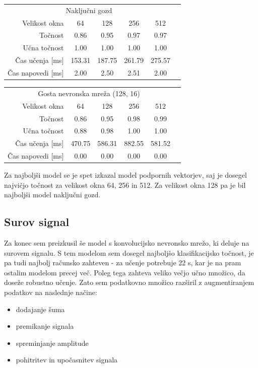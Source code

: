 \documentclass[11pt,a4paper]{article}
\begin{document}
\begin{center}
    \begin{tabular}{r | c c c c c}
        \multicolumn{5}{c}{Naključni gozd}\\
        \tiny{Velikost okna} & \small{64} & \small{128} & \small{256} & \small{512}\\ \hline
        \tiny{Točnost} & \small{0.86} & \small{0.95} & \small{0.97} & \small{0.97}\\
        \tiny{Učna točnost} & \small{1.00} & \small{1.00} & \small{1.00} & \small{1.00}\\
        \tiny{Čas učenja [ms]} & \small{153.31} & \small{187.75} & \small{261.79} & \small{275.57}\\
        \tiny{Čas napovedi [ms]} & \small{2.00} & \small{2.50} & \small{2.51} & \small{2.00}\\
        \end{tabular}

    \begin{tabular}{r | c c c c c}
        \multicolumn{5}{c}{Gosta nevronska mreža (128, 16)}\\
        \tiny{Velikost okna} & \small{64} & \small{128} & \small{256} & \small{512}\\ \hline
        \tiny{Točnost} & \small{0.86} & \small{0.95} & \small{0.98} & \small{0.99}\\
        \tiny{Učna točnost} & \small{0.88} & \small{0.98} & \small{1.00} & \small{1.00}\\
        \tiny{Čas učenja [ms]} & \small{470.75} & \small{586.31} & \small{882.55} & \small{581.52}\\
        \tiny{Čas napovedi [ms]} & \small{0.00} & \small{0.00} & \small{0.00} & \small{0.00}\\
        \end{tabular}
\end{center}


Za najboljši model se je spet izkazal model podpornih vektorjev, saj je dosegel najvičjo točnost za velikost okna 64, 256 in 512. Za velikost okna 128 pa je bil najboljši model naključni gozd. 


\subsection{Surov signal}

Za konec sem preizkusil še model s konvolucijsko nevronsko mrežo, ki deluje na surovem signalu. S tem modelom sem dosegel najboljšo klasifikacijsko točnost, je pa tudi najbolj računsko zahteven - za učenje potrebuje 22 s, kar je na pram ostalim modelom precej več. Poleg tega zahteva veliko večjo učno množico, da doseže robustno učenje. Zato sem podatkovno množico razširil z augmentiranjem podatkov na naslednje načine:
\begin{itemize}
    \item dodajanje šuma
    \item premikanje signala
    \item spreminjanje amplitude
    \item pohitritev in upočasnitev signala
\end{itemize}
\end{document}

